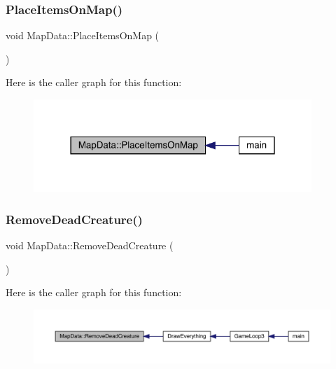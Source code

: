 \mbox{\label{class_map_data_aae575fa856f1d179220c4781873fd635}} 
\subsubsection{\texorpdfstring{Place\+Items\+On\+Map()}{PlaceItemsOnMap()}}
{\footnotesize\ttfamily void Map\+Data\+::\+Place\+Items\+On\+Map (\begin{DoxyParamCaption}{ }\end{DoxyParamCaption})}

Here is the caller graph for this function\+:
\nopagebreak
\begin{figure}[H]
\begin{center}
\leavevmode
\includegraphics[width=298pt]{de/d83/class_map_data_aae575fa856f1d179220c4781873fd635_icgraph}
\end{center}
\end{figure}
\mbox{\label{class_map_data_a737946a4648a34f99452a6bff1b727f6}} 
\subsubsection{\texorpdfstring{Remove\+Dead\+Creature()}{RemoveDeadCreature()}}
{\footnotesize\ttfamily void Map\+Data\+::\+Remove\+Dead\+Creature (\begin{DoxyParamCaption}{ }\end{DoxyParamCaption})}

Here is the caller graph for this function\+:
\nopagebreak
\begin{figure}[H]
\begin{center}
\leavevmode
\includegraphics[width=350pt]{de/d83/class_map_data_a737946a4648a34f99452a6bff1b727f6_icgraph}
\end{center}
\end{figure}
\mbox{\label{class_map_data_ad62fed28a640928527502b00b291aabd}} 
